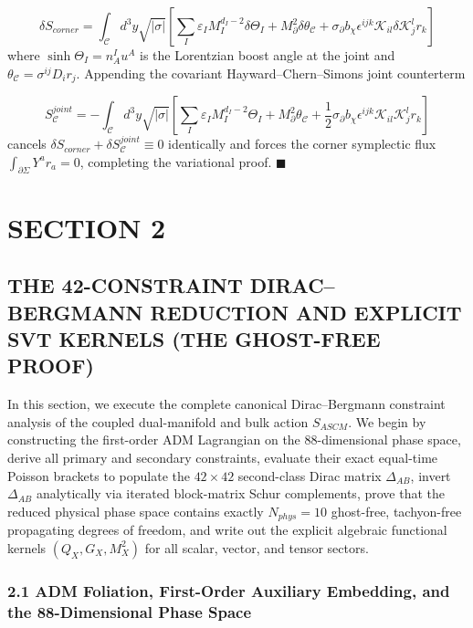 \documentclass[aps,prd,onecolumn,superscriptaddress,nofootinbib,longbibliography,10pt]{revtex4-2}
\begin{document}
  \[ \delta S_{corner} = \int_{\mathcal{C}} d^3y \sqrt{|\sigma|} \left[ \sum_I \varepsilon_I M_I^{d_I - 2}\delta\Theta_I + M_\partial^2 \delta\theta_{\mathcal{C}} + \sigma_\partial b_\chi \epsilon^{ijk}\mathcal{K}_{il}\delta\mathcal{K}^l_j r_k \right] \]
  where \(\sinh\Theta_I = n^I_A u^A\) is the Lorentzian boost angle at the joint and \(\theta_{\mathcal{C}} = \sigma^{ij}D_i r_j\). Appending the covariant Hayward–Chern–Simons joint counterterm


  \[ S_{\mathcal{C}}^{joint} = -\int_{\mathcal{C}} d^3y \sqrt{|\sigma|} \left[ \sum_I \varepsilon_I M_I^{d_I - 2}\Theta_I + M_\partial^2 \theta_{\mathcal{C}} + \frac{1}{2}\sigma_\partial b_\chi \epsilon^{ijk}\mathcal{K}_{il}\mathcal{K}^l_j r_k \right] \]
  cancels \(\delta S_{corner} + \delta S_{\mathcal{C}}^{joint} \equiv 0\) identically and forces the corner symplectic flux \(\int_{\partial\Sigma} Y^a r_a = 0\), completing the variational proof. \(\blacksquare\)




 

  
\section*{SECTION 2}

  
\subsection*{THE 42-CONSTRAINT DIRAC–BERGMANN REDUCTION AND EXPLICIT SVT KERNELS (THE GHOST-FREE PROOF)}

  In this section, we execute the complete canonical Dirac–Bergmann constraint analysis of the coupled dual-manifold and bulk action \(S_{ASCM}\). We begin by constructing the first-order ADM Lagrangian on the 88-dimensional phase space, derive all primary and secondary constraints, evaluate their exact equal-time Poisson brackets to populate the \(42 \times 42\) second-class Dirac matrix \(\Delta_{AB}\), invert \(\Delta_{AB}\) analytically via iterated block-matrix Schur complements, prove that the reduced physical phase space contains exactly \(N_{phys} = 10\) ghost-free, tachyon-free propagating degrees of freedom, and write out the explicit algebraic functional kernels \((Q_X, G_X, M_X^2)\) for all scalar, vector, and tensor sectors.


  
  
\subsubsection*{2.1 ADM Foliation, First-Order Auxiliary Embedding, and the 88-Dimensional Phase Space}
\end{document}
